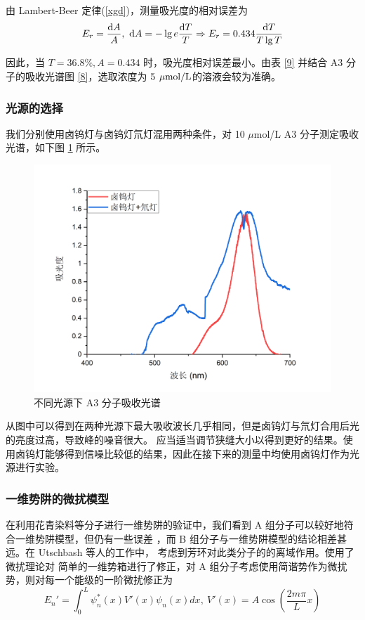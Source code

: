 \documentclass[cn,hazy,pku,12pt,normal,math=newtx,cite=super]{elegantnote}
\begin{document}
由 Lambert-Beer 定律(\ref{xgd})，测量吸光度的相对误差为
$$ E_r = \frac{{\rm d} A}{A} ,\ {\rm d} A = - \lg e \frac{{\rm d} T}{T} \Rightarrow  E_r =  0.434 \frac{{\rm d} T}{T \lg T} $$

因此，当 $T = 36.8\%, A = 0.434$ 时，吸光度相对误差最小。由表 \ref{9} 并结合 A3 分子的吸收光谱图 \ref{8}，选取浓度为 5 $\rm \mu mol/L$的溶液会较为准确。

\subsubsection{光源的选择}

我们分别使用卤钨灯与卤钨灯氘灯混用两种条件，对 10 $\mu$mol/L A3 分子测定吸收光谱，如下图 \ref{25}
所示。
\begin{figure}[htbp]
    \centering
    \includegraphics[width = .70\textwidth]{image/guangyuan.png}
    \caption{不同光源下 A3 分子吸收光谱}\label{25}
\end{figure}



从图中可以得到在两种光源下最大吸收波长几乎相同，但是卤钨灯与氘灯合用后光的亮度过高，导致峰的噪音很大。
应当适当调节狭缝大小以得到更好的结果。使用卤钨灯能够得到信噪比较低的结果，因此在接下来的测量中均使用卤钨灯作为光源进行实验。

\subsubsection{一维势阱的微扰模型}

在利用花青染料等分子进行一维势阱的验证中，我们看到 A 组分子可以较好地符合一维势阱模型，但仍有一些误差
，而 B 组分子与一维势阱模型的结论相差甚远。在 Utschbash 等人的工作中\cite{doi:10.1021/ed084p1840}，
考虑到芳环对此类分子的的离域作用。使用了微扰理论对
简单的一维势箱进行了修正，对 A 组分子考虑使用简谐势作为微扰势，则对每一个能级的一阶微扰修正为
\begin{equation}
    E_{n}'=\int _{0}^{L}\psi ^{\ast}_n (x) V'(x) \psi_n (x) dx ,\ V'(x) = A\cos(\frac{2m\pi}{L} x)
\end{equation}
\end{document}
